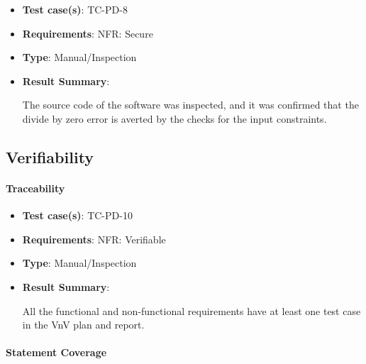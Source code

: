\documentclass[12pt, titlepage]{article}
\begin{document}
\begin{itemize}

\item \textbf{Test case(s)}: TC-PD-8

\item \textbf{Requirements}: NFR: Secure

\item \textbf{Type}: Manual/Inspection

\item \textbf{Result Summary}: 

The source code of the \progname{} software was 
inspected, and it was confirmed that the divide by zero error is averted by the checks for the 
input constraints.

\end{itemize}

\subsection{Verifiability}

\paragraph{Traceability}

\begin{itemize}

\item \textbf{Test case(s)}: TC-PD-10

\item \textbf{Requirements}: NFR: Verifiable

\item \textbf{Type}: Manual/Inspection

\item \textbf{Result Summary}: 

All the functional and non-functional requirements have at least 
one test case in the VnV plan \cite{VnVPlan} and report.

\end{itemize}

\paragraph{Statement Coverage}
\end{document}
